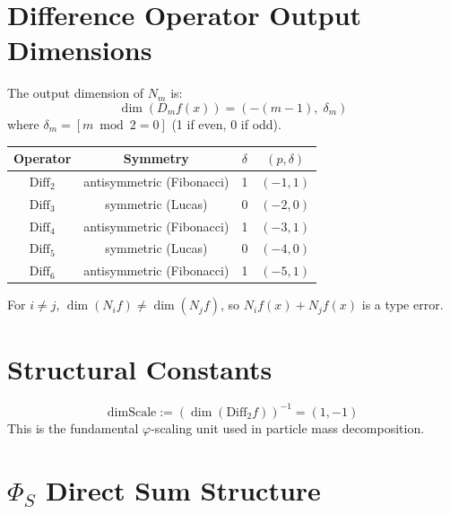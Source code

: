 \section{Difference Operator Output Dimensions}
\label{sec:dim_operator_output}

\begin{definition}
\label{def:dim_derive_fdim}
\leanok
The output dimension of $N_m$ is:
\[
\dim(D_m f(x)) = (-(m-1),\; \delta_m)
\]
where $\delta_m = [m \bmod 2 = 0]$ (1 if even, 0 if odd).
\end{definition}

\begin{center}
\begin{tabular}{|c|c|c|c|}
\hline
Operator & Symmetry & $\delta$ & $(p, \delta)$ \\
\hline
$\mathrm{Diff}_2$ & antisymmetric (Fibonacci) & 1 & $(-1, 1)$ \\
$\mathrm{Diff}_3$ & symmetric (Lucas) & 0 & $(-2, 0)$ \\
$\mathrm{Diff}_4$ & antisymmetric (Fibonacci) & 1 & $(-3, 1)$ \\
$\mathrm{Diff}_5$ & symmetric (Lucas) & 0 & $(-4, 0)$ \\
$\mathrm{Diff}_6$ & antisymmetric (Fibonacci) & 1 & $(-5, 1)$ \\
\hline
\end{tabular}
\end{center}

\begin{theorem}
\label{thm:dim_operators_distinct}
For $i \neq j$, $\dim(N_i f) \neq \dim(N_j f)$, so $N_i f(x) + N_j f(x)$ is a type error.
\end{theorem}

\section{Structural Constants}
\label{sec:dim_structural_constants}

\begin{definition}
\label{def:dim_time_D2}
\leanok
\[
\mathrm{dimScale} := (\dim(\mathrm{Diff}_2 f))^{-1} = (1, -1)
\]
This is the fundamental $\varphi$-scaling unit used in particle mass decomposition.
\end{definition}

\section{\texorpdfstring{$\Phi_S$}{Φ_S} Direct Sum Structure}
\label{sec:dim_d5half}

